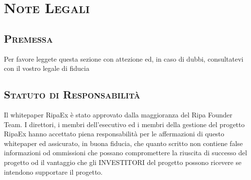 \documentclass[11pt,fleqn]{book} %
\begin{document}
\chapter{\textsc{Note Legali}}
\begin{scriptsize}
	{\scshape
		\section{\textsc{Premessa}}
		Per favore leggete questa sezione con attezione ed, in caso di dubbi, consultatevi con il vostro legale di fiducia
		\section{\textsc{Statuto di Responsabilità}} 
		Il whitepaper RipaEx è stato approvato dalla maggioranza del Ripa Founder Team.	I direttori, i membri 
		dell'esecutivo ed i membri della gestione del progetto RipaEx hanno accettato piena responsabilità
		per le affermazioni di questo whitepaper ed assicurato,	in buona fiducia, che quanto scritto non contiene false 
		informazioni od ommissioni che possano compromettere la riuscita di successo del progetto od 
		il vantaggio che gli INVESTITORI del progetto possono ricevere se intendono supportare il progetto.
}
\end{scriptsize}
\end{document}
